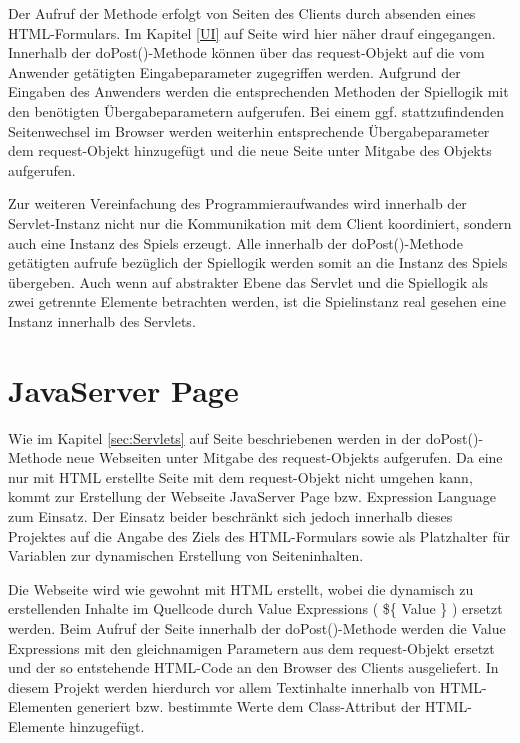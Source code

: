 Der Aufruf der Methode erfolgt von Seiten des Clients durch absenden eines HTML-Formulars. Im Kapitel \ref{UI} auf Seite \pageref{UI} wird hier näher drauf eingegangen. Innerhalb der doPost()-Methode können über das request-Objekt auf die vom Anwender getätigten Eingabeparameter zugegriffen werden. Aufgrund der Eingaben des Anwenders werden die entsprechenden Methoden der Spiellogik mit den benötigten Übergabeparametern aufgerufen. Bei einem ggf. stattzufindenden Seitenwechsel im Browser werden weiterhin entsprechende Übergabeparameter dem request-Objekt hinzugefügt und die neue Seite unter Mitgabe des Objekts aufgerufen.

Zur weiteren Vereinfachung des Programmieraufwandes wird innerhalb der Servlet-Instanz nicht nur die Kommunikation mit dem Client koordiniert, sondern auch eine Instanz des Spiels erzeugt. Alle innerhalb der doPost()-Methode getätigten aufrufe bezüglich der Spiellogik werden somit an die Instanz des Spiels übergeben. Auch wenn auf abstrakter Ebene das Servlet und die Spiellogik als zwei getrennte Elemente betrachten werden, ist die Spielinstanz real gesehen eine Instanz innerhalb des Servlets.

\section{JavaServer Page}
Wie im Kapitel \ref{sec:Servlets} auf Seite \pageref{sec:Servlets} beschriebenen werden in der doPost()-Methode neue Webseiten unter Mitgabe des request-Objekts aufgerufen. Da eine nur mit HTML erstellte Seite mit dem request-Objekt nicht umgehen kann, kommt zur Erstellung der Webseite JavaServer Page bzw. Expression Language zum Einsatz. Der Einsatz beider beschränkt sich jedoch innerhalb dieses Projektes auf die Angabe des Ziels des HTML-Formulars sowie als Platzhalter für Variablen zur dynamischen Erstellung von Seiteninhalten.

Die Webseite wird wie gewohnt mit HTML erstellt, wobei die dynamisch zu erstellenden Inhalte im Quellcode durch Value Expressions ( \$\{ Value \} ) ersetzt werden. Beim Aufruf der Seite innerhalb der doPost()-Methode werden die Value Expressions mit den gleichnamigen Parametern aus dem request-Objekt ersetzt und der so entstehende HTML-Code an den Browser des Clients ausgeliefert. In diesem Projekt werden hierdurch vor allem Textinhalte innerhalb von HTML-Elementen generiert bzw. bestimmte Werte dem Class-Attribut der HTML-Elemente hinzugefügt.

